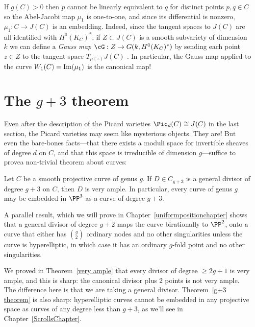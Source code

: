 If $g(C)>0$ then $p$ cannot be linearly equivalent to $q$ for distinct points $p, q \in C$ so the Abel-Jacobi map $\mu_1$ is one-to-one, and since its differential is nonzero, $\mu_1 : C \to J(C)$ is an embedding. Indeed, since the tangent spaces to $J(C)$ are all identified with $H^0(K_C)^*$, if $Z \subset J(C)$ is a smooth subvariety of dimension $k$ we can define a \emph{Gauss map} $\cG : Z \to G(k, H^0(K_C)^*)$ by sending each point $z \in Z$ to the tangent space $T_{\mu(z)} J(C)$ . In particular, the Gauss map applied to the curve $W_1(C) = {\rm Im}(\mu_1)$ is the canonical map! 


\section{The $g+3$ theorem}

Even after the description of the Picard varieties $\Pic_d(C) \cong J(C)$ in the last section, the Picard varieties may seem like mysterious objects. They are! But even the bare-bones facts---that there exists a  moduli space for invertible sheaves of degree $d$ on $C$, and that this space is irreducible of dimension $g$---suffice to provea non-trivial theorem about curves: 

\begin{theorem}\label{g+3 theorem}
Let $C$ be a smooth projective curve of genus $g$. If $D \in C_{g+3}$ is a general divisor of degree $g+3$ on $C$, then 
$D$ is very ample. In particular, every curve of genus $g$ may be embedded in $\PP^{3}$ as a curve of degree $g+3$.
\end{theorem}

A parallel result, which we will prove in Chapter~\ref{uniformpositionchapter} shows that a general divisor of degree $g+2$ maps the curve birationally to $\PP^2$, onto a curve that either has $\binom{g}{2}$ ordinary nodes and no other singularities unless the curve
is hyperelliptic, in which case it has an ordinary $g$-fold point and no other singularities.

We proved in Theorem~\ref{very ample} that every divisor of degree $\geq 2g+1$ is very ample, and this is sharp: the canonical divisor plus 2 points is not very ample. The difference here is that we are taking a general divisor. Theorem~\ref{g+3 theorem} is also sharp: hyperelliptic curves cannot be embedded in any projective space as curves of any degree less than $g+3$, as we'll see in Chapter~\ref{ScrollsChapter}. 

